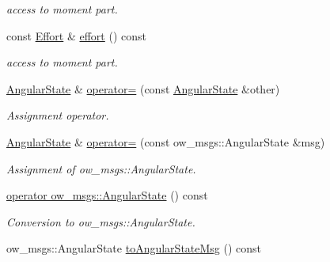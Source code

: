\begin{DoxyCompactItemize}
\begin{DoxyCompactList}\small\item\em access to moment part. \end{DoxyCompactList}\item 
const \hyperlink{classow__core_1_1Moment}{Effort} \& \hyperlink{classow__core_1_1AngularState_ab0b84e0ffa3fe2c4d00afffabdfd00c5}{effort} () const \hypertarget{classow__core_1_1AngularState_ab0b84e0ffa3fe2c4d00afffabdfd00c5}{}\label{classow__core_1_1AngularState_ab0b84e0ffa3fe2c4d00afffabdfd00c5}

\begin{DoxyCompactList}\small\item\em access to moment part. \end{DoxyCompactList}\item 
\hyperlink{classow__core_1_1AngularState}{Angular\+State} \& \hyperlink{classow__core_1_1AngularState_ad44d13408b024d96248c88e385a2b700}{operator=} (const \hyperlink{classow__core_1_1AngularState}{Angular\+State} \&other)\hypertarget{classow__core_1_1AngularState_ad44d13408b024d96248c88e385a2b700}{}\label{classow__core_1_1AngularState_ad44d13408b024d96248c88e385a2b700}

\begin{DoxyCompactList}\small\item\em Assignment operator. \end{DoxyCompactList}\item 
\hyperlink{classow__core_1_1AngularState}{Angular\+State} \& \hyperlink{classow__core_1_1AngularState_aa02eda2405c4137ae4d052bc5e2001e8}{operator=} (const ow\+\_\+msgs\+::\+Angular\+State \&msg)\hypertarget{classow__core_1_1AngularState_aa02eda2405c4137ae4d052bc5e2001e8}{}\label{classow__core_1_1AngularState_aa02eda2405c4137ae4d052bc5e2001e8}

\begin{DoxyCompactList}\small\item\em Assignment of ow\+\_\+msgs\+::\+Angular\+State. \end{DoxyCompactList}\item 
\hyperlink{classow__core_1_1AngularState_ae1bcc701fb56caeade7fadb90fa043ad}{operator ow\+\_\+msgs\+::\+Angular\+State} () const \hypertarget{classow__core_1_1AngularState_ae1bcc701fb56caeade7fadb90fa043ad}{}\label{classow__core_1_1AngularState_ae1bcc701fb56caeade7fadb90fa043ad}

\begin{DoxyCompactList}\small\item\em Conversion to ow\+\_\+msgs\+::\+Angular\+State. \end{DoxyCompactList}\item 
ow\+\_\+msgs\+::\+Angular\+State \hyperlink{classow__core_1_1AngularState_a302f7891b265a67d476547c7795fa048}{to\+Angular\+State\+Msg} () const \hypertarget{classow__core_1_1AngularState_a302f7891b265a67d476547c7795fa048}{}\label{classow__core_1_1AngularState_a302f7891b265a67d476547c7795fa048}


\end{DoxyCompactItemize}
